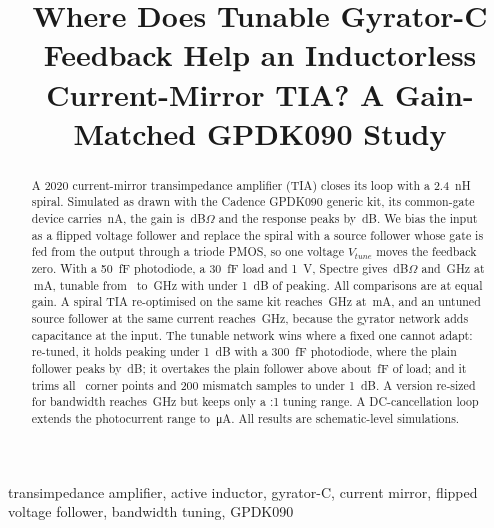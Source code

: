 \documentclass[conference]{IEEEtran}
\begin{document}
\title{Where Does Tunable Gyrator-C Feedback Help an Inductorless Current-Mirror TIA? A Gain-Matched GPDK090 Study}

\author{}

\maketitle

\begin{abstract}
A 2020 current-mirror transimpedance amplifier (TIA) closes its loop with a \SI{2.4}{nH} spiral. Simulated as drawn with the Cadence GPDK090 generic kit, its common-gate device carries \BaseMoneI\,nA, the gain is \BaseZt\,dB$\Omega$ and the response peaks by \BasePk\,dB. We bias the input as a flipped voltage follower and replace the spiral with a source follower whose gate is fed from the output through a triode PMOS, so one voltage $V_{tune}$ moves the feedback zero. With a \SI{50}{fF} photodiode, a \SI{30}{fF} load and \SI{1}{V}, Spectre gives \PoneZt\,dB$\Omega$ and \PoneBw\,GHz at \PoneI\,mA, tunable from \PoneTuneMin\ to \PoneTuneMax\,GHz with under \SI{1}{dB} of peaking. All comparisons are at equal gain. A spiral TIA re-optimised on the same kit reaches \BoneBw\,GHz at \BoneI\,mA, and an untuned source follower at the same current reaches \FoneBw\,GHz, because the gyrator network adds capacitance at the input. The tunable network wins where a fixed one cannot adapt: re-tuned, it holds peaking under \SI{1}{dB} with a \SI{300}{fF} photodiode, where the plain follower peaks by \PfPkThreeHundred\,dB; it overtakes the plain follower above about \ClCross\,fF of load; and it trims all \NPvt\ corner points and 200 mismatch samples to under \SI{1}{dB}. A version re-sized for bandwidth reaches \PtwoBw\,GHz but keeps only a \PtwoTuneRatio:1 tuning range. A DC-cancellation loop extends the photocurrent range to \DcLim\,\si{\micro A}. All results are schematic-level simulations.
\end{abstract}

\begin{IEEEkeywords}
transimpedance amplifier, active inductor, gyrator-C, current mirror, flipped voltage follower, bandwidth tuning, GPDK090
\end{IEEEkeywords}
\end{document}
